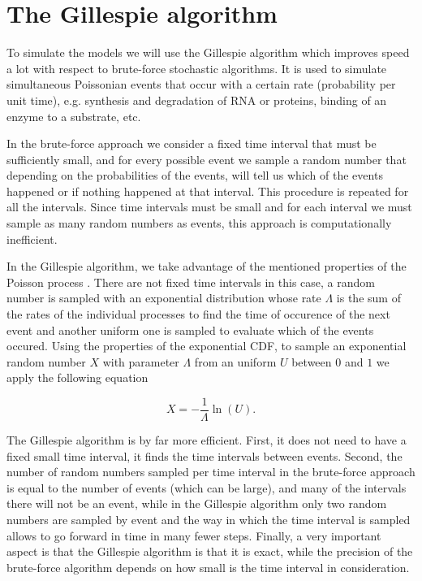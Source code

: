 \section{The Gillespie algorithm}

To simulate the models we will use the Gillespie algorithm \cite{gillespie77} which improves speed a lot with respect to brute-force stochastic algorithms. It is used to simulate simultaneous Poissonian events that occur with a certain rate (probability per unit time), e.g. synthesis and degradation of RNA or proteins, binding of an enzyme to a substrate, etc.

In the brute-force approach we consider a fixed time interval that must be sufficiently small, and for every possible event we sample a random number that depending on the probabilities of the events, will tell us which of the events happened or if nothing happened at that interval. This procedure is repeated for all the intervals. Since time intervals must be small and for each interval we must sample as many random numbers as events, this approach is computationally inefficient.

In the Gillespie algorithm, we take advantage of the mentioned properties of the Poisson process \cite{bertsekas08}. There are not fixed time intervals in this case, a random number is sampled with an exponential distribution whose rate $\Lambda$ is the sum of the rates of the individual processes to find the time of occurence of the next event and another uniform one is sampled to evaluate which of the events occured. Using the properties of the exponential CDF, to sample an exponential random number $X$ with parameter $\Lambda$ from an uniform $U$ between $0$ and $1$ we apply the following equation

\begin{equation}
  X = -\frac{1}{\Lambda}\ln(U).
\end{equation}

The Gillespie algorithm is by far more efficient. First, it does not need to have a fixed small time interval, it finds the time intervals between events. Second, the number of random numbers sampled per time interval in the brute-force approach is equal to the number of events (which can be large), and many of the intervals there will not be an event, while in the Gillespie algorithm only two random numbers are sampled by event and the way in which the time interval is sampled allows to go forward in time in many fewer steps. Finally, a very important aspect is that the Gillespie algorithm is that it is exact, while the precision of the brute-force algorithm depends on how small is the time interval in consideration.
